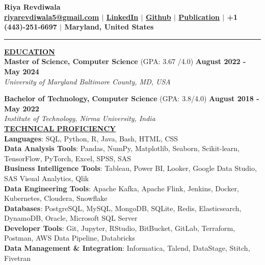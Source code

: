 \documentclass{article}
\begin{document}
\begin{center}
\thispagestyle{empty}
\large \textbf{Riya Revdiwala \\}
\normalsize \textbf{\href{mailto:riyarevdiwala5@gmail.com}{riyarevdiwala5@gmail.com} $\mid$ \href{https://www.linkedin.com/in/riya-revdiwala/}{LinkedIn} $\mid$ \href{https://github.com/riyarevdiwala}{Github} $\mid$ \href{https://www.igi-global.com/gateway/article/304726}{Publication} $\mid$ +1 (443)-251-6697 $\mid$ Maryland, United States \\}
\rule{\textwidth}{1pt}
\end{center}


\noindent \textbf{\underline{EDUCATION}} \\
\textbf{Master of Science, Computer Science} (GPA: 3.67 /4.0)  \hfill \textbf{August 2022 - May 2024} \\
\textit{University of Maryland Baltimore County, MD, USA}\\
\begin{itemize}[noitemsep,nolistsep,leftmargin=*]
\end{itemize}
\textbf{Bachelor of Technology, Computer Science} (GPA: 3.8/4.0) \hfill \textbf{August 2018 - May 2022} \\
\textit{Institute of Technology, Nirma University, India} \\


\noindent \textbf{\underline{TECHNICAL PROFICIENCY}} \\
\textbf{Languages}{: \small SQL, Python, R, Java, Bash, HTML, CSS} \\
\textbf{Data Analysis Tools}{: \small Pandas, NumPy, Matplotlib, Seaborn, Scikit-learn, TensorFlow, PyTorch, Excel, SPSS, SAS} \\
\textbf{Business Intelligence Tools}{: \small Tableau, Power BI, Looker, Google Data Studio, SAS Visual Analytics, Qlik} \\
\textbf{Data Engineering Tools}{: \small Apache Kafka, Apache Flink, Jenkins, Docker, Kubernetes, Cloudera, Snowflake} \\
\textbf{Databases}{: \small PostgreSQL, MySQL, MongoDB, SQLite, Redis, Elasticsearch, DynamoDB, Oracle, Microsoft SQL Server} \\
\textbf{Developer Tools}{: \small Git, Jupyter, RStudio, BitBucket, GitLab, Terraform, Postman, AWS Data Pipeline, Databricks} \\
\textbf{Data Management \& Integration}{: \small Informatica, Talend, DataStage, Stitch, Fivetran} \\
\end{document}
